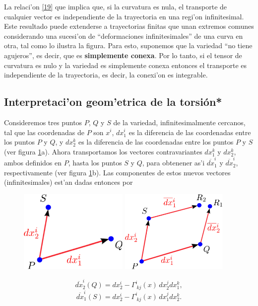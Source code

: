 La relaci'on \eqref{19} que implica que, si la curvatura es nula, el transporte de cualquier vector es independiente de la trayectoria en una regi'on infinitesimal. Este resultado puede extenderse a trayectorias finitas que unan extremos comunes considerando una sucesi'on de ``deformaciones infinitesimales'' de una curva en otra, tal como lo ilustra la figura. Para esto, suponemos que la variedad ``no tiene agujeros'', es decir, que es \textbf{simplemente conexa}. Por lo tanto, si el tensor de curvatura es nulo y la variedad es simplemente conexa entonces el transporte es independiente de la trayectoria, es decir, la conexi'on es integrable.

\subsection{Interpretaci'on geom'etrica de la torsi\'on*}
Consideremos tres puntos $P$, $Q$ y $S$ de la variedad, infinitesimalmente
cercanos, tal que las coordenadas de $P$ son $x^i $, $dx_1^i $ es la
diferencia de las coordenadas entre los puntos $P$ y $Q$, y $dx_2^k $ es la
diferencia de las coordenadas entre los puntos $P$ y $S$ (ver figura \ref{fig:torsion}a). 
Ahora transportamos los vectores contravariantes $dx_1^k $ y $dx_2^k $, ambos definidos en $P$, hasta los puntos $S$ y $Q$, para obtenener as'i $\overline{dx}^i_1$ y $\overline{dx}^i_2$, respectivamente (ver figura \ref{fig:torsion}b). Las componentes de estos nuevos vectores (infinitesimales) est'an dadas entonces por
\begin{center}
\begin{figure}[H]
\centerline{\includegraphics[height=4cm]{fig/fig-torsion-01.pdf}
\hspace{1cm}\includegraphics[height=4cm]{fig/fig-torsion-02.pdf}}
\caption{}
\label{fig:torsion}
\end{figure}
\end{center}
\begin{equation}
\overline{dx}_2^i (Q)=dx_2^i -\Gamma_{\ kj}^i(x)\, dx_2^j dx_1^k ,
\end{equation}
\begin{equation}
\overline{dx}_1^i (S)=dx_2^i -\Gamma_{\ kj}^i(x)\, dx_1^j dx_2^k .
\end{equation}


